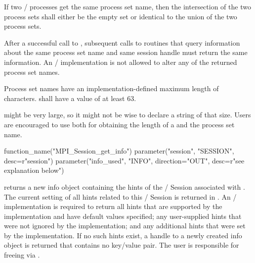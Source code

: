 If two \MPI/ processes get the same process set name, then the intersection of the two process sets shall either be the empty set or identical to the union of the two process sets.

After a successful call to , subsequent calls to routines that query information about the same process set name and same session handle must return the same information. An \MPI/ implementation is not allowed to alter any of the returned process set names.

Process set names have an implementation-defined maximum length of  characters.   shall have a value of at least 63.

\begin{users}
 might be very large, so it
might not be wise to declare a string of that size.
Users are encouraged to use 
both for obtaining the length of a  and the process set name.
\end{users}

\begin{mpi-binding}
    function_name("MPI_Session_get_info")
    parameter("session", "SESSION", desc=r"session")
    parameter("info_used", "INFO", direction="OUT", desc=r"see explanation below")
\end{mpi-binding}

 returns a new info object containing
the hints of the \MPI/ Session  associated with .
The current setting of all hints related to this \MPI/ Session is
returned in .  An \MPI/ implementation is required to
return all hints that are supported by the implementation and have
default values specified; any user-supplied hints that were not ignored
by the implementation; and any additional hints that were set by
the implementation.
If no such hints
exist, a handle to a newly created info object is returned that
contains no key/value pair.
The user is responsible for freeing
 via .

